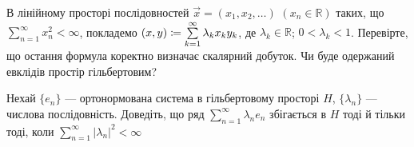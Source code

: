 \begin{exercise}\label{N:1_2_27}
    В лінійному просторі послідовностей $\vec{x} = (x_1, x_2, \dots)$
    $(x_n \in \mathbb{R})$ таких, що $\sum\limits^\infty_{n=1} x_n^2 < \infty$,
    покладемо $\left(x, y\right) \coloneqq \sum\limits^\infty_{k=1} \lambda_k x_k y_k$,
    де $\lambda_k \in \mathbb{R}$; $0 < \lambda_k < 1$. Перевірте, що остання формула
    коректно визначає скалярний добуток. Чи буде одержаний евклідів простір гільбертовим?
\end{exercise}

\begin{exercise}
    Нехай $\{e_n\}$ --- ортонормована система в гільбертовому просторі $H$,
    $\{\lambda_n\}$ --- числова послідовність. Доведіть, що ряд $\sum\limits^\infty_{n=1}
    \lambda_n e_n$ збігається в $H$ тоді й тільки тоді, коли $\sum\limits^\infty_{n=1}
    |\lambda_n|^2 < \infty$
\end{exercise}